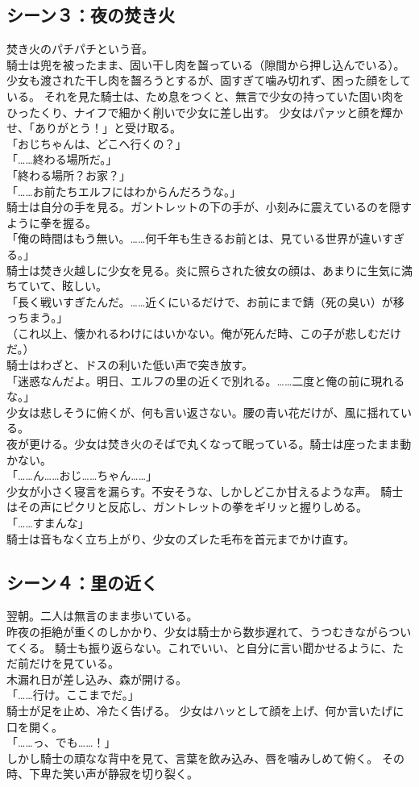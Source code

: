 \subsection{シーン３：夜の焚き火}
焚き火のパチパチという音。\\
騎士は兜を被ったまま、固い干し肉を齧っている（隙間から押し込んでいる）。
少女も渡された干し肉を齧ろうとするが、固すぎて噛み切れず、困った顔をしている。
それを見た騎士は、ため息をつくと、無言で少女の持っていた固い肉をひったくり、ナイフで細かく削いで少女に差し出す。
少女はパァッと顔を輝かせ、「ありがとう！」と受け取る。
\\「おじちゃんは、どこへ行くの？」
\\「……終わる場所だ。」
\\「終わる場所？お家？」
\\「……お前たちエルフにはわからんだろうな。」\\
騎士は自分の手を見る。ガントレットの下の手が、小刻みに震えているのを隠すように拳を握る。
\\「俺の時間はもう無い。……何千年も生きるお前とは、見ている世界が違いすぎる。」\\
騎士は焚き火越しに少女を見る。炎に照らされた彼女の顔は、あまりに生気に満ちていて、眩しい。
\\「長く戦いすぎたんだ。……近くにいるだけで、お前にまで錆（死の臭い）が移っちまう。」
\\（これ以上、懐かれるわけにはいかない。俺が死んだ時、この子が悲しむだけだ。）\\
騎士はわざと、ドスの利いた低い声で突き放す。
\\「迷惑なんだよ。明日、エルフの里の近くで別れる。……二度と俺の前に現れるな。」\\
少女は悲しそうに俯くが、何も言い返さない。腰の青い花だけが、風に揺れている。\\

夜が更ける。少女は焚き火のそばで丸くなって眠っている。騎士は座ったまま動かない。
\\「……ん……おじ……ちゃん……」\\
少女が小さく寝言を漏らす。不安そうな、しかしどこか甘えるような声。
騎士はその声にピクリと反応し、ガントレットの拳をギリッと握りしめる。
\\「……すまんな」\\
騎士は音もなく立ち上がり、少女のズレた毛布を首元までかけ直す。

\subsection{シーン４：里の近く}
翌朝。二人は無言のまま歩いている。\\
昨夜の拒絶が重くのしかかり、少女は騎士から数歩遅れて、うつむきながらついてくる。
騎士も振り返らない。これでいい、と自分に言い聞かせるように、ただ前だけを見ている。\\
木漏れ日が差し込み、森が開ける。
\\「……行け。ここまでだ。」\\
騎士が足を止め、冷たく告げる。
少女はハッとして顔を上げ、何か言いたげに口を開く。
\\「……っ、でも……！」\\
しかし騎士の頑なな背中を見て、言葉を飲み込み、唇を噛みしめて俯く。
その時、下卑た笑い声が静寂を切り裂く。

